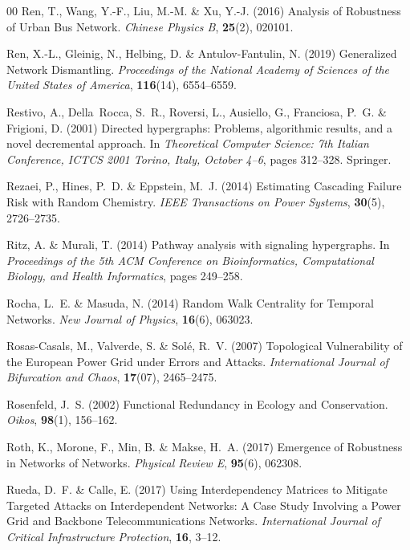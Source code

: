 \documentclass{comnet-mod}
\begin{document}
\begin{thebibliography}{00}
Ren, T., Wang, Y.-F., Liu, M.-M. {\&} Xu, Y.-J. (2016)  {Analysis of Robustness
  of Urban Bus Network}. {\em {Chinese Physics B}}, \textbf{25}(2), 020101.

Ren, X.-L., Gleinig, N., Helbing, D. {\&} {Antulov-Fantulin}, N. (2019)
  {Generalized Network Dismantling}. {\em {Proceedings of the National Academy
  of Sciences of the United States of America}}, \textbf{116}(14), 6554--6559.

Restivo, A., Della~Rocca, S.~R., Roversi, L., Ausiello, G., Franciosa, P.~G.
  {\&} Frigioni, D. (2001)  {Directed hypergraphs: Problems, algorithmic
  results, and a novel decremental approach}. In {\em {Theoretical Computer
  Science: 7th Italian Conference, ICTCS 2001 Torino, Italy, October 4--6}},
  pages 312--328. Springer.

Rezaei, P., Hines, P.~D. {\&} Eppstein, M.~J. (2014)  {Estimating Cascading
  Failure Risk with Random Chemistry}. {\em {IEEE Transactions on Power
  Systems}}, \textbf{30}(5), 2726--2735.

Ritz, A. {\&} Murali, T. (2014)  Pathway analysis with signaling hypergraphs.
  In {\em {Proceedings of the 5th ACM Conference on Bioinformatics,
  Computational Biology, and Health Informatics}}, pages 249--258.

Rocha, L.~E. {\&} Masuda, N. (2014)  {Random Walk Centrality for Temporal
  Networks}. {\em {New Journal of Physics}}, \textbf{16}(6), 063023.

{Rosas-Casals}, M., Valverde, S. {\&} Sol{\'e}, R.~V. (2007)  {Topological
  Vulnerability of the {{European}} Power Grid under Errors and Attacks}. {\em
  {International Journal of Bifurcation and Chaos}}, \textbf{17}(07),
  2465--2475.

Rosenfeld, J.~S. (2002)  {Functional Redundancy in Ecology and Conservation}.
  {\em {Oikos}}, \textbf{98}(1), 156--162.

Roth, K., Morone, F., Min, B. {\&} Makse, H.~A. (2017)  {Emergence of
  Robustness in Networks of Networks}. {\em {Physical Review E}},
  \textbf{95}(6), 062308.

Rueda, D.~F. {\&} Calle, E. (2017)  {Using Interdependency Matrices to Mitigate
  Targeted Attacks on Interdependent Networks: {{A}} Case Study Involving a
  Power Grid and Backbone Telecommunications Networks}. {\em {International
  Journal of Critical Infrastructure Protection}}, \textbf{16}, 3--12.


\end{thebibliography}
\end{document}

